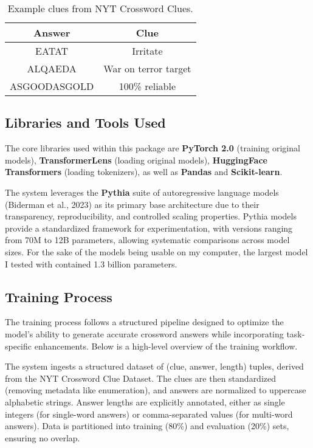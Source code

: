 \documentclass[
	a4paper, %
	10pt, %
	unnumberedsections, %
	twoside, %
]{LTJournalArticle}
\begin{document}
\begin{table}[h] %
	\centering
	\begin{tabular}{c c}
		\toprule
		Answer & Clue \\
		\midrule
		EATAT & Irritate\\
		ALQAEDA & War on terror target\\
		ASGOODASGOLD & 100\% reliable\\
		\bottomrule
	\end{tabular}
	\caption{Example clues from NYT Crossword Clues.}
	\label{tab:NYTClues}
\end{table}

\subsection{Libraries and Tools Used}

The core libraries used within this package are \textbf{PyTorch 2.0} (training original models), \textbf{TransformerLens} (loading original models), \textbf{HuggingFace Transformers} (loading tokenizers), as well as \textbf{Pandas} and \textbf{Scikit-learn}.

\noindent The system leverages the \textbf{Pythia} suite of autoregressive language models (Biderman et al., 2023) as its primary base architecture due to their transparency, reproducibility, and controlled scaling properties. Pythia models provide a standardized framework for experimentation, with versions ranging from 70M to 12B parameters, allowing systematic comparisons across model sizes. For the sake of the models being usable on my computer, the largest model I tested with contained 1.3 billion parameters.

\subsection{Training Process}

The training process follows a structured pipeline designed to optimize the model’s ability to generate accurate crossword answers while incorporating task-specific enhancements. Below is a high-level overview of the training workflow.

The system ingests a structured dataset of (clue, answer, length) tuples, derived from the NYT Crossword Clue Dataset. The clues are then standardized (removing metadata like enumeration), and answers are normalized to uppercase alphabetic strings. Answer lengths are explicitly annotated, either as single integers (for single-word answers) or comma-separated values (for multi-word answers). Data is partitioned into training (80\%) and evaluation (20\%) sets, ensuring no overlap.
\end{document}
